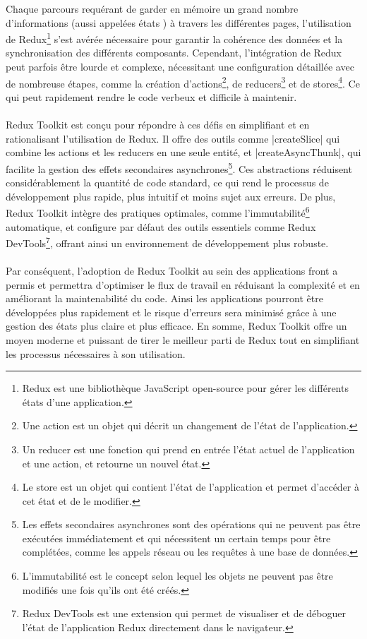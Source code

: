 \documentclass[12pt, a4paper]{report}
\begin{document}
	Chaque parcours requérant de garder en mémoire un grand nombre d'informations (aussi appelées \flqq{} états \frqq{}) à travers les différentes pages, l'utilisation de Redux\footnote{Redux est une bibliothèque JavaScript open-source pour gérer les différents états d'une application.} s'est avérée nécessaire pour garantir la cohérence des données et la synchronisation des différents composants. Cependant, l'intégration de Redux peut parfois être lourde et complexe, nécessitant une configuration détaillée avec de nombreuse étapes, comme la création d'actions\footnote{Une action est un objet qui décrit un changement de l'état de l'application.}, de reducers\footnote{Un reducer est une fonction qui prend en entrée l'état actuel de l'application et une action, et retourne un nouvel état.} et de stores\footnote{Le store est un objet qui contient l'état de l'application et permet d'accéder à cet état et de le modifier.}. Ce qui peut rapidement rendre le code verbeux et difficile à maintenir.
	\\\\
	Redux Toolkit est conçu pour répondre à ces défis en simplifiant et en rationalisant l'utilisation de Redux. Il offre des outils comme \cverb|createSlice| qui combine les actions et les reducers en une seule entité, et \cverb|createAsyncThunk|, qui facilite la gestion des effets secondaires asynchrones\footnote{Les effets secondaires asynchrones sont des opérations qui ne peuvent pas être exécutées immédiatement et qui nécessitent un certain temps pour être complétées, comme les appels réseau ou les requêtes à une base de données.}. Ces abstractions réduisent considérablement la quantité de code standard, ce qui rend le processus de développement plus rapide, plus intuitif et moins sujet aux erreurs. De plus, Redux Toolkit intègre des pratiques optimales, comme l'immutabilité\footnote{L'immutabilité est le concept selon lequel les objets ne peuvent pas être modifiés une fois qu'ils ont été créés.} automatique, et configure par défaut des outils essentiels comme Redux DevTools\footnote{Redux DevTools est une extension qui permet de visualiser et de déboguer l'état de l'application Redux directement dans le navigateur.}, offrant ainsi un environnement de développement plus robuste.
	\\\\
	Par conséquent, l'adoption de Redux Toolkit au sein des applications front a permis et permettra d'optimiser le flux de travail en réduisant la complexité et en améliorant la maintenabilité du code. Ainsi les applications pourront être développées plus rapidement et le risque d'erreurs sera minimisé grâce à une gestion des états plus claire et plus efficace. En somme, Redux Toolkit offre un moyen moderne et puissant de tirer le meilleur parti de Redux tout en simplifiant les processus nécessaires à son utilisation.
\end{document}
